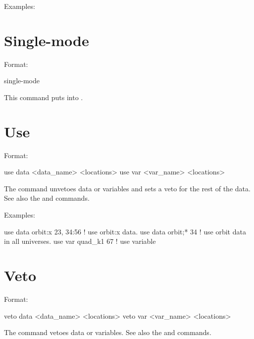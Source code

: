 Examples:

\section{Single-mode}
\label{s:sing}

Format:
\begin{example}
  single-mode
\end{example}

\vskip 0.2in 
This command puts \tao into . 

\section{Use}
\label{s:use}

Format:
\begin{example}
  use data  <data_name> <locations>
  use var <var_name> <locations>
\end{example}

\vskip 0.2in 
The  command unvetoes data or variables and sets a veto for
the rest of the data. See also the  and 
commands.

Examples:
\begin{example}
  use data orbit:x  23, 34:56 ! use orbit:x data.
  use data orbit;* 34         ! use orbit data in all universes.
  use var quad_k1 67          ! use variable
\end{example}


\section{Veto}
\label{s:veto}

Format:
\begin{example}
  veto data <data_name> <locations>
  veto var <var_name> <locations>
\end{example}

\vskip 0.2in 
The  command vetoes data or variables. See also the
 and  commands.

